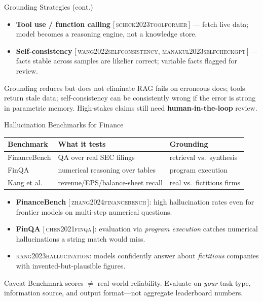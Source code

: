 \documentclass[9pt,t]{beamer}
\newcommand{\citesrc}[1]{\textsc{\small #1}}
\providecommand{\citet}[1]{\citesrc{#1}}
\providecommand{\citep}[1]{{\footnotesize[\,\citesrc{#1}\,]}}
\begin{document}
\begin{frame}{Grounding Strategies (cont.)}
\begin{underhood}
\footnotesize
\begin{itemize}\itemsep2pt
  \item \textbf{Tool use / function calling} \citep{schick2023toolformer} ---
        fetch live data; model becomes a reasoning engine, not a knowledge store.
  \item \textbf{Self-consistency} \citep{wang2022selfconsistency,
        manakul2023selfcheckgpt} --- facts stable across samples are likelier
        correct; variable facts flagged for review.
\end{itemize}
\end{underhood}

\smallskip
\begin{alertblock}{Grounding reduces but does not eliminate}
RAG fails on erroneous docs; tools return stale data; self-consistency can be
consistently wrong if the error is strong in parametric memory. High-stakes
claims still need \textbf{human-in-the-loop} review.
\end{alertblock}
\end{frame}

\begin{frame}{Hallucination Benchmarks for Finance}
\centering
\begin{tabular}{lll}
\toprule
\textbf{Benchmark} & \textbf{What it tests} & \textbf{Grounding} \\
\midrule
FinanceBench & QA over real SEC filings & retrieval vs.\ synthesis \\
FinQA        & numerical reasoning over tables & program execution \\
Kang et al.\ & revenue/EPS/balance-sheet recall & real vs.\ fictitious firms \\
\bottomrule
\end{tabular}

\medskip
\raggedright
\begin{itemize}
  \item \textbf{FinanceBench} \citep{zhang2024financebench}: high hallucination
        rates even for frontier models on multi-step numerical questions.
  \item \textbf{FinQA} \citep{chen2021finqa}: evaluation via \emph{program
        execution} catches numerical hallucinations a string match would miss.
  \item \citet{kang2023hallucination}: models confidently answer about
        \emph{fictitious} companies with invented-but-plausible figures.
\end{itemize}

\medskip
\begin{block}{Caveat}
Benchmark scores $\neq$ real-world reliability. Evaluate on \emph{your} task
type, information source, and output format---not aggregate leaderboard numbers.
\end{block}
\end{frame}
\end{document}
